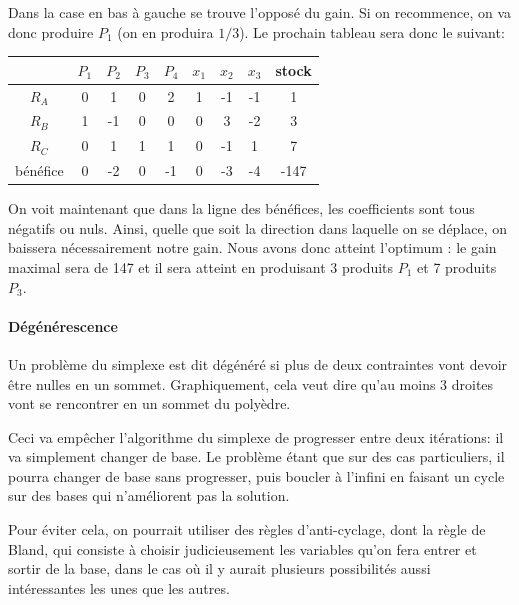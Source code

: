       Dans la case en bas à gauche se trouve l'opposé du gain. Si on
      recommence, on va donc produire $P_1$ (on en produira $1/3$). Le prochain
      tableau sera donc le suivant:

      \begin{center}
        \begin{tabular}{|c|ccccccc|c|}\hline
          & $P_1$ & $P_2$ & $P_3$ & $P_4$ & $x_1$ & $x_2$ & $x_3$ & stock \\ \hline
          $R_A$ & 0 & 1 & 0 & 2 & 1 & -1 & -1 & 1 \\
          $R_B$ & 1 & -1 & 0 & 0 & 0 & 3 & -2 & 3 \\
          $R_C$ & 0 & 1 & 1 & 1 & 0 & -1 & 1 & 7 \\ \hline
          bénéfice & 0 & -2 & 0 & -1 & 0 & -3 & -4 & -147 \\ \hline
        \end{tabular}
      \end{center}

      On voit maintenant que dans la ligne des bénéfices, les coefficients sont
      tous négatifs ou nuls. Ainsi, quelle que soit la direction dans laquelle on
      se déplace, on baissera nécessairement notre gain. Nous avons donc
      atteint l'optimum : le gain maximal sera de 147 et il sera atteint en
      produisant 3 produits $P_1$ et 7 produits $P_3$.



    \paragraph{Dégénérescence}
      Un problème du simplexe est dit dégénéré si plus de deux contraintes vont
      devoir être nulles en un sommet. Graphiquement, cela veut dire
      qu'au moins 3 droites vont se rencontrer en un sommet du polyèdre.

      Ceci va empêcher l'algorithme du simplexe de progresser entre deux
      itérations: il va simplement changer de base. Le problème étant que sur
      des cas particuliers, il pourra changer de base sans progresser, puis
      boucler à l'infini en faisant un cycle sur des bases qui n'améliorent pas
      la solution.

      Pour éviter cela, on pourrait utiliser des règles d'anti-cyclage, dont la
      règle de Bland, qui consiste à choisir judicieusement les variables qu'on
      fera entrer et sortir de la base, dans le cas où il y aurait plusieurs
      possibilités aussi intéressantes les unes que les autres.

